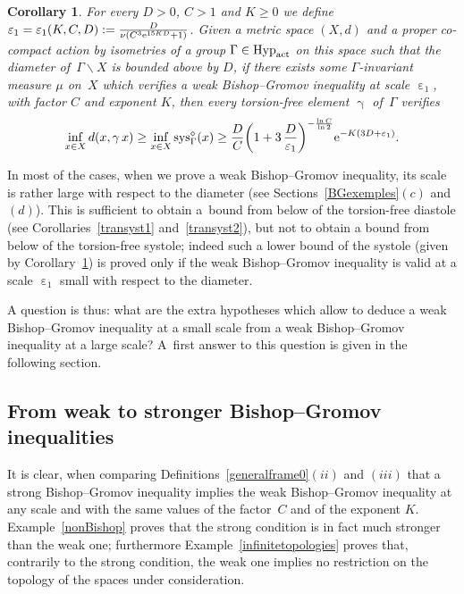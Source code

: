 \documentclass[pdftex]{sigma}
\numberwithin{equation}{section}
\newtheorem{Corollary}[theor]{Corollary}
\newcommand{\sys}{\operatorname{sys}}
\newcommand{\g}{\operatorname{\gamma}}
\newcommand{\e}{\operatorname{\varepsilon}}
\begin{document}
\begin{Corollary}\label{minorsystole1}
For every $D >0$, $C > 1 $ and $K\ge 0$ we define $\e_1 = \e_1 (K, C, D) := \frac{D}{\nu \left(C^3 {\rm e}^{15 K D} + 1\right)}$. Given a metric space $(X,d)$ and a proper co-compact action by isometries of a group $\Gamma \in \text{\rm Hyp}_{\rm act}$
on this space such that the diameter of~$\Gamma \backslash X$ is bounded above by $D$, if there exists some $\Gamma$-invariant measure $\mu$ on~$X$ which verifies a weak Bishop--Gromov inequality at scale $\e_1$, with factor $C$ and exponent $K$, then every torsion-free element $\g$ of~$\Gamma$ verifies
\begin{gather*}
\inf_{x \in X} d(x, \g x) \ge \inf_{x \in X} \sys^{\diamond}_\Gamma (x)
\ge \frac{D}{C} \bigg(1 + 3\, \frac{D}{\e_1}\bigg)^{- \frac{\ln C}{\ln 2}} {\rm e}^{- K (3 D + \e_1)}.
\end{gather*}
\end{Corollary}

In most of the cases, when we prove a weak Bishop--Gromov inequality, its scale is rather large with respect to the diameter (see Sections~\ref{BGexemples}$(c)$ and $(d)$). This is sufficient to obtain a~bound from below of the torsion-free diastole (see Corollaries~\ref{transyst1} and~\ref{transyst2}), but not to obtain a bound from below of the torsion-free systole; indeed such a lower bound of the systole (given by Corollary~\ref{minorsystole1}) is proved only
if the weak Bishop--Gromov inequality is valid at a scale $\e_1$ small with respect to the diameter.


A question is thus: what are the extra hypotheses which allow to deduce a
weak Bishop--Gromov inequality at a small scale from a weak Bishop--Gromov inequality
at a large scale? A~first answer to this question is given in the following section.

\subsection{From weak to stronger Bishop--Gromov inequalities}\label{weakvsstrongBishop}

It is clear, when comparing Definitions~\ref{generalframe0}$(ii)$ and $(iii)$ that a strong Bishop--Gromov inequality implies the weak Bishop--Gromov inequality at
any scale and with the same values of the factor~$C$ and of the exponent $K$. Example~\ref{nonBishop} proves that the strong condition is in fact much
stronger than the weak one; furthermore Example~\ref{infinitetopologies} proves that, contrarily to the strong condition, the weak one implies no restriction
on the topology of the spaces under consideration.
\end{document}
